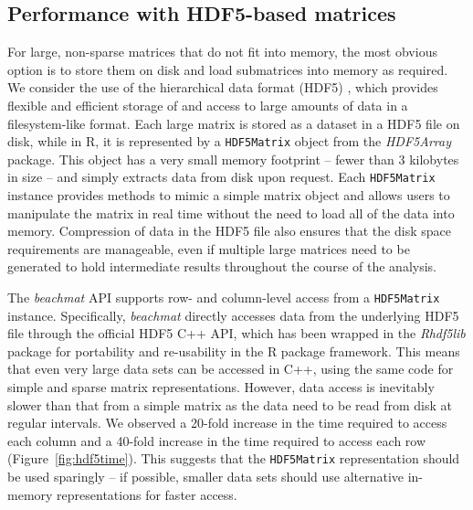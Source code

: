 \documentclass[10pt,letterpaper]{article}
\newcommand{\beachmat}{\textit{beachmat}}
\newcommand{\code}[1]{\texttt{#1}}
\begin{document}
\subsection*{Performance with HDF5-based matrices}
For large, non-sparse matrices that do not fit into memory, the most obvious option is to store them on disk and load submatrices into memory as required.
We consider the use of the hierarchical data format (HDF5) \cite{hdf5}, which provides flexible and efficient storage of and access to large amounts of data in a filesystem-like format.
Each large matrix is stored as a dataset in a HDF5 file on disk, while in R, it is represented by a \code{HDF5Matrix} object from the \textit{HDF5Array} package.
This object has a very small memory footprint -- fewer than 3 kilobytes in size -- and simply extracts data from disk upon request.
Each \code{HDF5Matrix} instance provides methods to mimic a simple matrix object and allows users to manipulate the matrix in real time without the need to load all of the data into memory.
Compression of data in the HDF5 file also ensures that the disk space requirements are manageable, even if multiple large matrices need to be generated to hold intermediate results throughout the course of the analysis.

The \beachmat{} API supports row- and column-level access from a \code{HDF5Matrix} instance.
Specifically, \beachmat{} directly accesses data from the underlying HDF5 file through the official HDF5 C++ API, which has been wrapped in the \textit{Rhdf5lib} package for portability and re-usability in the R package framework.
This means that even very large data sets can be accessed in C++, using the same code for simple and sparse matrix representations.
However, data access is inevitably slower than that from a simple matrix as the data need to be read from disk at regular intervals.
We observed a 20-fold increase in the time required to access each column and a 40-fold increase in the time required to access each row (Figure~\ref{fig:hdf5time}).
This suggests that the \code{HDF5Matrix} representation should be used sparingly -- if possible, smaller data sets should use alternative in-memory representations for faster access.
\end{document}

